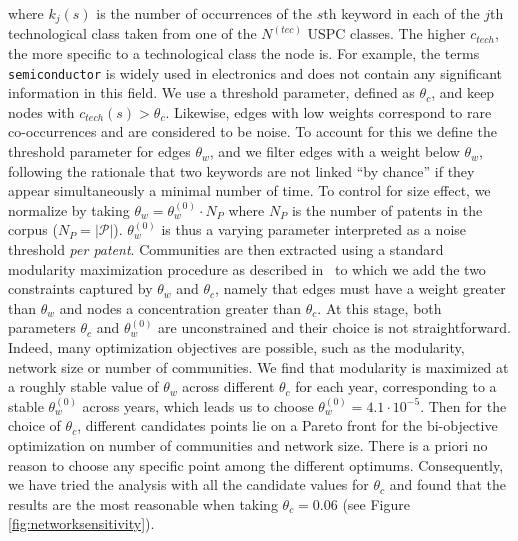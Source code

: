 \documentclass[article]{article}%
\begin{document}
where $k_j(s)$ is the number of occurrences of the $s$th keyword in each of the $j$th technological class taken from one of the $N^{(tec)}$ USPC classes. The higher $c_{tech}$, the more specific to a technological class the node is. For example, the terms \texttt{semiconductor} is widely used in electronics and does not contain any significant information in this field. We use a threshold parameter, defined as $\theta_c$, and keep nodes with $c_{tech}(s) > \theta_c$. Likewise, edges with low weights correspond to rare co-occurrences and are considered to be noise. To account for this we define the threshold parameter for edges $\theta_w$, and we filter edges with a weight below $\theta_w$, following the rationale that two keywords are not linked ``by chance'' if they appear simultaneously a minimal number of time. To control for size effect, we normalize by taking $\theta_w = \theta_w^{(0)}\cdot N_P$ where $N_P$ is the number of patents in the corpus ($N_P = \left|\mathcal{P} \right|$). $\theta_w^{(0)}$ is thus a varying parameter interpreted as a noise threshold \emph{per patent}. Communities are then extracted using a standard modularity maximization procedure as described in~\cite{clauset2004finding} to which we add the two constraints captured by $\theta_w$ and $\theta_c$, namely that edges must have a weight greater than $\theta_w$ and nodes a concentration greater than $\theta_c$. At this stage, both parameters $\theta_c$ and $\theta_w^{(0)}$ are unconstrained and their choice is not straightforward. Indeed, many optimization objectives are possible, such as the modularity, network size or number of communities. We find that modularity is maximized at a roughly stable value of $\theta_w$ across different $\theta_c$ for each year, corresponding to a stable $\theta_w^{(0)}$ across years, which leads us to choose $\theta_w^{(0)} = 4.1\cdot 10^{-5}$. Then for the choice of $\theta_c$, different candidates points lie on a Pareto front for the bi-objective optimization on number of communities and network size. There is a priori no reason to choose any specific point among the different optimums. Consequently, we have tried the analysis with all the candidate values for $\theta_c$ and found that the results are the most reasonable when taking $\theta_c = 0.06$ (see Figure {\ref{fig:networksensitivity}}).
\end{document}
